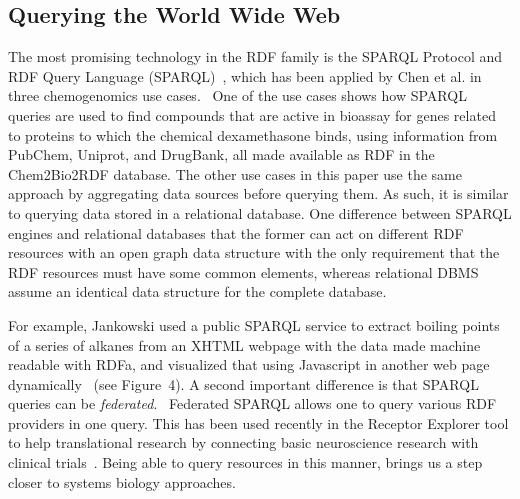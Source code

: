 \documentclass[10pt]{bmc_article}
\newenvironment{bmcformat}{\begin{raggedright}\baselineskip20pt\sloppy\setboolean{publ}{false}}{\end{raggedright}\baselineskip20pt\sloppy}
\begin{document}
\begin{bmcformat}
\section{Querying the World Wide Web}

The most promising technology in the RDF family is the
SPARQL Protocol and RDF Query Language (SPARQL)~\cite{PrudHommeaux2008}, which has been
applied by Chen et al. in three chemogenomics use cases.~\cite{CHE2010}
One of the use cases shows how SPARQL queries are used to find compounds 
that are active in bioassay for genes related to proteins
to which the chemical dexamethasone binds, using information
from PubChem, Uniprot, and DrugBank, all made available as RDF in the Chem2Bio2RDF
database. The other use cases in this paper use the same approach
by aggregating data sources before querying them. As such, it is similar to
querying data stored in a relational database. One difference between SPARQL engines and relational databases that the former can act on different RDF resources with an open graph data structure with the only requirement that the RDF resources must have some common elements, whereas relational DBMS assume an identical data structure for the complete database.


For example, Jankowski used a public
SPARQL service to extract boiling points of a series of alkanes from an XHTML
webpage with the data made machine readable with RDFa, and visualized that using
Javascript in another web page dynamically~\cite{Jankowski2010} (see
Figure~4). A second important difference is that SPARQL queries can be
\textit{federated}.~\cite{Prudhommeaux2007Custom}
Federated SPARQL allows one to query various RDF providers in one query. This has
been used recently in the Receptor Explorer tool to help translational research
by connecting basic neuroscience research with clinical trials~\cite{Cheung2009}.
Being able to query resources in this manner, brings us a step closer to
systems biology approaches.


\end{bmcformat}
\end{document}
